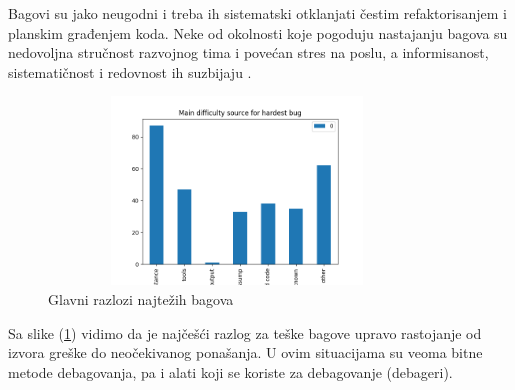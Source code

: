 \documentclass[a4paper]{article}
\begin{document}
Bagovi su jako neugodni i treba ih sistematski otklanjati čestim refaktorisanjem i planskim građenjem koda. Neke od okolnosti koje pogoduju nastajanju bagova su nedovoljna stručnost razvojnog tima i povećan stres na poslu, a informisanost, sistematičnost i redovnost ih suzbijaju \cite{bagovi_smalkov}.

\begin{figure}[h!]
	\begin{center}
		\includegraphics[width=100mm,height=50mm]{Slike/bagovi.png}
	\end{center}
	\caption{Glavni razlozi najtežih bagova \cite{study_bugs}}
	\label{fig:bagovi}
\end{figure}

Sa slike (\ref{fig:bagovi}) vidimo da je najčešći razlog za teške bagove upravo rastojanje od izvora greške do neočekivanog ponašanja. U ovim situacijama su veoma bitne metode debagovanja, pa i alati koji se koriste za debagovanje (debageri).
\end{document}
